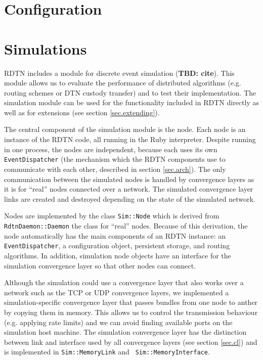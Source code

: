 \documentclass{article}
\begin{document}
\section{Configuration}\label{sec.config}

\section{Simulations}\label{sec.sim}

RDTN includes a module for discrete event simulation ({\bf TBD: cite}). This
module allows us to evaluate the performance of distributed algorithms (e.g.
routing schemes or DTN custody transfer) and to test their implementation. The
simulation module can be used for the functionality included in RDTN
directly as well as for extensions (see section \ref{sec.extending}).

The central component of the simulation module is the node. Each node is an
instance of the RDTN code, all running in the Ruby interpreter. Despite running
in one process, the nodes are independent, because each uses its own {\tt
EventDispatcher} (the mechanism which the RDTN components use to communicate
with each other, described in section \ref{sec.arch}). The only communication
between the simulated nodes is handled by convergence layers as it is for
``real'' nodes connected over a network. The simulated convergence layer links
are created and destroyed depending on the state of the simulated network.

Nodes are implemented by the class {\tt Sim::Node} which is derived from {\tt
RdtnDaemon::Daemon} the class for ``real'' nodes. Because of this derivation,
the node automatically has the main components of an RDTN instance: an {\tt
EventDispatcher}, a configuration object, persistent storage, and routing
algorithms. In addition, simulation node objects have an interface for the
simulation convergence layer so that other nodes can connect.

Although the simulation could use a convergence layer that also works over a
network such as the TCP or UDP convergence layers, we implemented a
simulation-specific convergence layer that passes bundles from one node to
anther by copying them in memory. This allows us to control the transmission
behaviour (e.g. applying rate limits) and we can avoid finding available ports
on the simulation host machine. The simulation convergence layer has
the distinction between link and interface used by all convergence layers (see
section \ref{sec.cl}) and is implemented in {\tt Sim::MemoryLink} and {\tt
Sim::MemoryInterface}.
\end{document}
